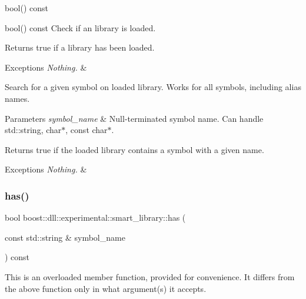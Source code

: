 bool() const 

bool() const  Check if an library is loaded.

\begin{DoxyReturn}{Returns}
true if a library has been loaded. 
\end{DoxyReturn}

\begin{DoxyExceptions}{Exceptions}
{\em Nothing.} & \\
\hline
\end{DoxyExceptions}
Search for a given symbol on loaded library. Works for all symbols, including alias names.


\begin{DoxyParams}{Parameters}
{\em symbol\+\_\+name} & Null-\/terminated symbol name. Can handle std\+::string, char$\ast$, const char$\ast$. \\
\hline
\end{DoxyParams}
\begin{DoxyReturn}{Returns}
{\ttfamily true} if the loaded library contains a symbol with a given name. 
\end{DoxyReturn}

\begin{DoxyExceptions}{Exceptions}
{\em Nothing.} & \\
\hline
\end{DoxyExceptions}
\mbox{\label{a01712_a9263542eeb995ab16f85901d90d1f868}} 
\subsubsection{\texorpdfstring{has()}{has()}\hspace{0.1cm}{\footnotesize\ttfamily [2/2]}}
{\footnotesize\ttfamily bool boost\+::dll\+::experimental\+::smart\+\_\+library\+::has (\begin{DoxyParamCaption}\item[{const std\+::string \&}]{symbol\+\_\+name }\end{DoxyParamCaption}) const\hspace{0.3cm}{\ttfamily [inline]}}





This is an overloaded member function, provided for convenience. It differs from the above function only in what argument(s) it accepts. \mbox{\label{a01712_abe903598b2f65c04360d58943cc08255}} 
